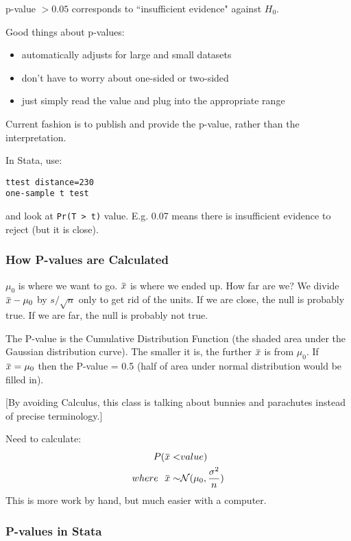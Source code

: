 \documentclass[11pt, oneside]{article}   	%
\newcommand{\overbar}[1]{\mkern 1.5mu\overline{\mkern-1.5mu#1\mkern-1.5mu}\mkern 1.5mu}
\begin{document}
p-value $> 0.05$ corresponds to ``insufficient evidence" against $H_0$.

Good things about p-values:
\begin{itemize}
\item{automatically adjusts for large and small datasets}
\item{don't have to worry about one-sided or two-sided}
\item{just simply read the value and plug into the appropriate range}
\end{itemize}

Current fashion is to publish and provide the p-value, rather than the interpretation.

In Stata, use:
\begin{verbatim}
ttest distance=230
one-sample t test
\end{verbatim}
and look at \texttt{Pr(T > t)} value. E.g. 0.07 means there is insufficient evidence to reject (but it is close).

\subsubsection{How P-values are Calculated}

$\mu_0$ is where we want to go. $\overbar{x}$ is where we ended up. How far are we? We divide $\overbar{x} - \mu_0$ by $s / \sqrt{n}$ only to get rid of the units. If we are close, the null is probably true. If we are far, the null is probably not true.

The P-value is the Cumulative Distribution Function (the shaded area under the Gaussian distribution curve). The smaller it is, the further $\overbar{x}$ is from $\mu_0$. If $\overbar{x} = \mu_0$ then the P-value = 0.5 (half of area under normal distribution would be filled in).

[By avoiding Calculus, this class is talking about bunnies and parachutes instead of precise terminology.]

Need to calculate:
\begin{align*}
P(\overbar{x} <& value) \\
where \  \ \overbar{x} \sim& \mathcal{N}(\mu_0, \frac{\sigma^2}{n})
\end{align*}
This is more work by hand, but much easier with a computer.

\subsubsection{P-values in Stata}
\end{document}
